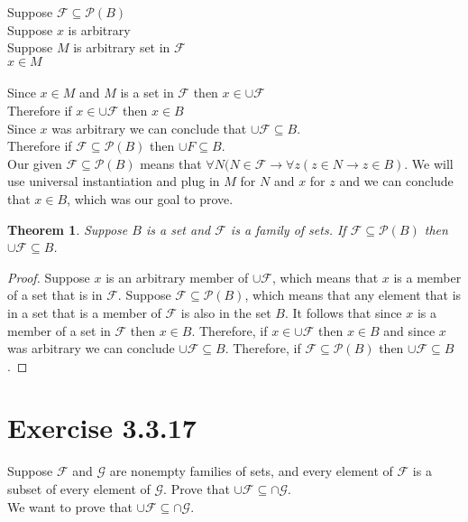 \documentclass{article}
\newcommand{\n}{ \noindent }
\newcommand{\F}{\mathcal{F}}
\newcommand{\G}{\mathcal{G}}
\newcommand{\pwset}{\mathscr{P}}
\newtheorem*{theorem}{Theorem}  %
\begin{document}
\n Suppose $\F \subseteq \pwset(B)$ \\
\indent Suppose $x$ is arbitrary \\
\indent \indent Suppose $M$ is arbitrary set in $\F$ \\
\indent \indent \indent $x \in M$ \\
\indent \indent \indent \indent [proof of $x \in B$] \\
\indent \indent \indent Since $x \in M$ and $M$ is a set in $\F$ then $x \in \cup \F$ \\
\indent \indent Therefore if $x \in \cup \F$ then $x \in B$ \\
\indent Since $x$ was arbitrary we can conclude that $\cup \F \subseteq B$. \\
\n Therefore if $\F \subseteq \pwset(B)$ then $\cup F \subseteq B$. \\


\n Our given $\F \subseteq \pwset(B)$ means that $\forall N(N \in \F \rightarrow \forall z(z \in N \rightarrow z \in B)$. We will use universal instantiation and plug in $M$ for $N$ and $x$ for $z$ and we can conclude that $x \in B$, which was our goal to prove.

\begin{theorem} Suppose $B$ is a set and $\F$ is a family of sets. If $\F \subseteq \pwset(B)$ then $\cup \F \subseteq B$.
\end{theorem}
\begin{proof}
Suppose $x$ is an arbitrary member of $\cup \F$, which means that $x$ is a member of a set that is in $\F$. Suppose $\F \subseteq \pwset(B)$, which means that any element that is in a set that is a member of $\F$ is also in the set $B$. It follows that since $x$ is a member of a set in $\F$ then $x \in B$. Therefore, if $x \in \cup \F$ then $x \in B$ and since $x$ was arbitrary we can conclude $\cup \F \subseteq B$. Therefore, if $\F \subseteq \pwset(B)$ then $\cup \F \subseteq B$.
\end{proof}

\section*{Exercise 3.3.17}
\n Suppose $\F$ and $\G$ are nonempty families of sets, and every element of $\F$ is a subset of every element of $\G$. Prove that $\cup \F \subseteq \cap \G$.\\

\n We want to prove that
$\cup \F \subseteq \cap \G$. \\
\end{document}
